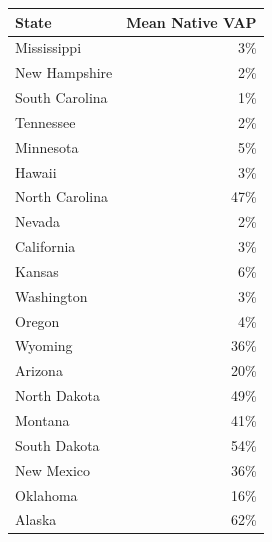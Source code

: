 \begin{tabular}{lr}
\hline
 State          &   Mean Native VAP \\
\hline
 Mississippi    &                3\% \\
 New Hampshire  &                2\% \\
 South Carolina &                1\% \\
 Tennessee      &                2\% \\
 Minnesota      &                5\% \\
 Hawaii         &                3\% \\
 North Carolina &               47\% \\
 Nevada         &                2\% \\
 California     &                3\% \\
 Kansas         &                6\% \\
 Washington     &                3\% \\
 Oregon         &                4\% \\
 Wyoming        &               36\% \\
 Arizona        &               20\% \\
 North Dakota   &               49\% \\
 Montana        &               41\% \\
 South Dakota   &               54\% \\
 New Mexico     &               36\% \\
 Oklahoma       &               16\% \\
 Alaska         &               62\% \\
\hline
\end{tabular}